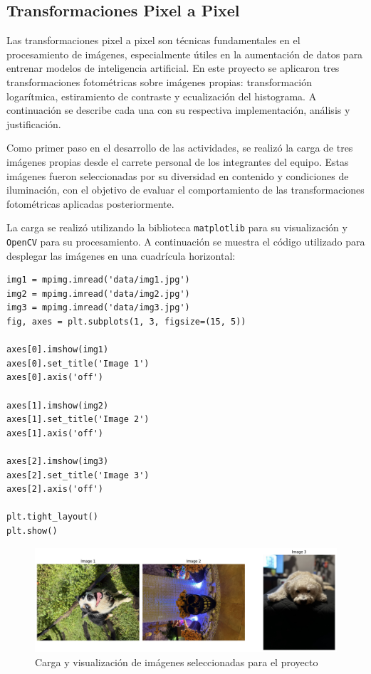 \documentclass[12pt,letterpaper]{article}
\begin{document}
\subsection{Transformaciones Pixel a Pixel}

Las transformaciones pixel a pixel son técnicas fundamentales en el procesamiento de imágenes, especialmente útiles en la aumentación de datos para entrenar modelos de inteligencia artificial. En este proyecto se aplicaron tres transformaciones fotométricas sobre imágenes propias: transformación logarítmica, estiramiento de contraste y ecualización del histograma. A continuación se describe cada una con su respectiva implementación, análisis y justificación.

Como primer paso en el desarrollo de las actividades, se realizó la carga de tres imágenes propias desde el carrete personal de los integrantes del equipo. Estas imágenes fueron seleccionadas por su diversidad en contenido y condiciones de iluminación, con el objetivo de evaluar el comportamiento de las transformaciones fotométricas aplicadas posteriormente.

La carga se realizó utilizando la biblioteca \texttt{matplotlib} para su visualización y \texttt{OpenCV} para su procesamiento. A continuación se muestra el código utilizado para desplegar las imágenes en una cuadrícula horizontal:

\begin{verbatim}
img1 = mpimg.imread('data/img1.jpg')
img2 = mpimg.imread('data/img2.jpg')
img3 = mpimg.imread('data/img3.jpg')
fig, axes = plt.subplots(1, 3, figsize=(15, 5))

axes[0].imshow(img1)
axes[0].set_title('Image 1')
axes[0].axis('off')

axes[1].imshow(img2)
axes[1].set_title('Image 2')
axes[1].axis('off')

axes[2].imshow(img3)
axes[2].set_title('Image 3')
axes[2].axis('off')

plt.tight_layout()
plt.show()
\end{verbatim}

\begin{figure}[H]
    \centering
    \includegraphics[width=0.9\linewidth]{figuras/carga_imagenes.png}
    \caption{Carga y visualización de imágenes seleccionadas para el proyecto}
    \label{fig:carga_imagenes}
\end{figure}
\end{document}
